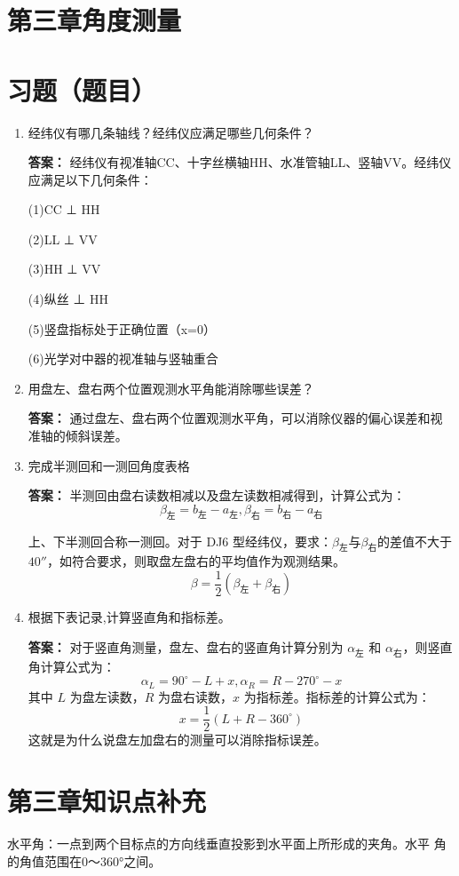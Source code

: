 \documentclass[12pt,a4paper]{article}
\newcounter{question}
\newenvironment{questions}{
    \setcounter{question}{0}
    \section*{习题（题目）}
    \begin{enumerate}[leftmargin=1.5em,label={\arabic*．}]
}{
    \end{enumerate}
}
\newcommand{\answer}[1]{\par\noindent\textbf{答案：} #1\par\vspace{1em}}
\begin{document}
\section*{第三章\quad 角度测量}
\begin{questions}
    \item 经纬仪有哪几条轴线？经纬仪应满足哪些几何条件？
    \answer{经纬仪有视准轴CC、十字丝横轴HH、水准管轴LL、竖轴VV。经纬仪应满足以下几何条件：

    (1)CC ⊥ HH

    (2)LL ⊥ VV

    (3)HH ⊥ VV

    (4)纵丝 ⊥ HH

    (5)竖盘指标处于正确位置（x=0）

    (6)光学对中器的视准轴与竖轴重合}

    \item 用盘左、盘右两个位置观测水平角能消除哪些误差？
    \answer{通过盘左、盘右两个位置观测水平角，可以消除仪器的偏心误差和视准轴的倾斜误差。}    

    \item 完成半测回和一测回角度表格
    
    \answer{半测回由盘右读数相减以及盘左读数相减得到，计算公式为：
\[
\beta_{\text{左}} = b_{\text{左}} - a_{\text{左}},\beta_{\text{右}} = b_{\text{右}} - a_{\text{右}}
\]

上、下半测回合称一测回。对于 DJ6 型经纬仪，要求：\(\beta_{\text{左}}\)与\(\beta_{\text{右}}\)的差值不大于 \(40''\)，如符合要求，则取盘左盘右的平均值作为观测结果。
\[
\beta = \frac{1}{2} (\beta_{\text{左}} + \beta_{\text{右}})
\]}

    \item 根据下表记录,计算竖直角和指标差。
    
    \answer{对于竖直角测量，盘左、盘右的竖直角计算分别为 \(\alpha_{\text{左}}\) 和 \(\alpha_{\text{右}}\)，则竖直角计算公式为：
    $$\alpha _ { L } = 9 0 ^ { \circ } - L + x,\alpha _ { R } = R - 270 ^ { \circ } - x$$
    其中 \(L\) 为盘左读数，\(R\) 为盘右读数，\(x\) 为指标差。指标差的计算公式为：
    $$x = \frac{1}{2} (L + R - 360^\circ)$$
    这就是为什么说盘左加盘右的测量可以消除指标误差。
    }
\end{questions}

\section*{第三章\quad 知识点补充}
水平角：一点到两个目标点的方向线垂直投影到水平面上所形成的夹角。水平
角的角值范围在0～360°之间。 
\end{document}
